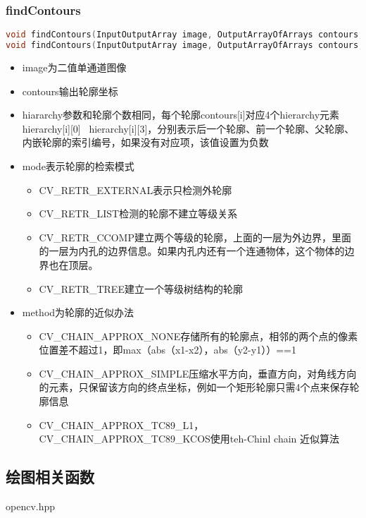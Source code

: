 \documentclass[12pt]{article}
\begin{document}
\subsubsection{findContours}
\begin{lstlisting}[language=c++]
void findContours(InputOutputArray image, OutputArrayOfArrays contours, OutputArray hierarchy, int mode, int method, Point offset=Point())
void findContours(InputOutputArray image, OutputArrayOfArrays contours, int mode, int method, Point offset=Point())
\end{lstlisting}
\begin{itemize}
\item image为二值单通道图像
\item contours输出轮廓坐标
\item hiararchy参数和轮廓个数相同，每个轮廓contours[i]对应4个hierarchy元素hierarchy[i][0] ~hierarchy[i][3]，分别表示后一个轮廓、前一个轮廓、父轮廓、内嵌轮廓的索引编号，如果没有对应项，该值设置为负数
\item mode表示轮廓的检索模式
	\begin{itemize}
	\item CV\_RETR\_EXTERNAL表示只检测外轮廓
	\item CV\_RETR\_LIST检测的轮廓不建立等级关系
	\item CV\_RETR\_CCOMP建立两个等级的轮廓，上面的一层为外边界，里面的一层为内孔的边界信息。如果内孔内还有一个连通物体，这个物体的边界也在顶层。
	\item CV\_RETR\_TREE建立一个等级树结构的轮廓
	\end{itemize}
\item method为轮廓的近似办法
	\begin{itemize}
	\item CV\_CHAIN\_APPROX\_NONE存储所有的轮廓点，相邻的两个点的像素位置差不超过1，即max（abs（x1-x2），abs（y2-y1））==1
	\item CV\_CHAIN\_APPROX\_SIMPLE压缩水平方向，垂直方向，对角线方向的元素，只保留该方向的终点坐标，例如一个矩形轮廓只需4个点来保存轮廓信息
	\item CV\_CHAIN\_APPROX\_TC89\_L1，CV\_CHAIN\_APPROX\_TC89\_KCOS使用teh-Chinl chain 近似算法
	\end{itemize}
\end{itemize}



\subsection{绘图相关函数}
opencv.hpp
\end{document}
